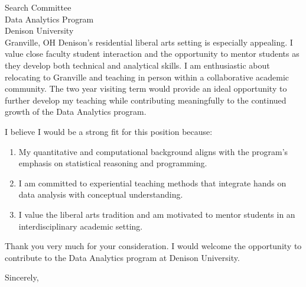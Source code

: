\documentclass[11pt,letterpaper]{letter}
\begin{document}
\begin{letter}{
Search Committee \\
Data Analytics Program \\
Denison University \\
Granville, OH
}
Denison’s residential liberal arts setting is especially appealing. I value close faculty student interaction and the opportunity to mentor students as they develop both technical and analytical skills. I am enthusiastic about relocating to Granville and teaching in person within a collaborative academic community. The two year visiting term would provide an ideal opportunity to further develop my teaching while contributing meaningfully to the continued growth of the Data Analytics program.

I believe I would be a strong fit for this position because:
\begin{enumerate}
    \item My quantitative and computational background aligns with the program’s emphasis on statistical reasoning and programming.
    \item I am committed to experiential teaching methods that integrate hands on data analysis with conceptual understanding.
    \item I value the liberal arts tradition and am motivated to mentor students in an interdisciplinary academic setting.
\end{enumerate}

Thank you very much for your consideration. I would welcome the opportunity to contribute to the Data Analytics program at Denison University.

\closing{Sincerely,}

\end{letter}
\end{document}
